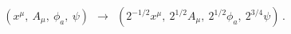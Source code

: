 \begin{equation}
(x^{\mu},~A_{\mu},~\phi_{a},~\psi)~~\longrightarrow ~~(2^{-1/2}x^{\mu},~2^{1/2}A_{\mu},~2^{1/2}\phi_{a},~2^{3/4}\psi)\,.\label{change}
\end{equation}

